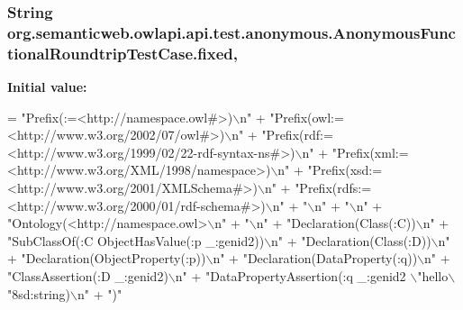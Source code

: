 \hypertarget{classorg_1_1semanticweb_1_1owlapi_1_1api_1_1test_1_1anonymous_1_1_anonymous_functional_roundtrip_test_case_afb329aafe42661dcf0c787507485b0ac}{
\subsubsection[{fixed}]{\setlength{\rightskip}{0pt plus 5cm}String org.\-semanticweb.\-owlapi.\-api.\-test.\-anonymous.\-Anonymous\-Functional\-Roundtrip\-Test\-Case.\-fixed\hspace{0.3cm}{\ttfamily [static]}, {\ttfamily [private]}}}\label{classorg_1_1semanticweb_1_1owlapi_1_1api_1_1test_1_1anonymous_1_1_anonymous_functional_roundtrip_test_case_afb329aafe42661dcf0c787507485b0ac}
{\bfseries Initial value\-:}
\begin{DoxyCode}
= \textcolor{stringliteral}{"Prefix(:=<http://namespace.owl#>)\(\backslash\)n"}
            + \textcolor{stringliteral}{"Prefix(owl:=<http://www.w3.org/2002/07/owl#>)\(\backslash\)n"}
            + \textcolor{stringliteral}{"Prefix(rdf:=<http://www.w3.org/1999/02/22-rdf-syntax-ns#>)\(\backslash\)n"}
            + \textcolor{stringliteral}{"Prefix(xml:=<http://www.w3.org/XML/1998/namespace>)\(\backslash\)n"}
            + \textcolor{stringliteral}{"Prefix(xsd:=<http://www.w3.org/2001/XMLSchema#>)\(\backslash\)n"}
            + \textcolor{stringliteral}{"Prefix(rdfs:=<http://www.w3.org/2000/01/rdf-schema#>)\(\backslash\)n"} + \textcolor{stringliteral}{"\(\backslash\)n"} + \textcolor{stringliteral}{"\(\backslash\)n"}
            + \textcolor{stringliteral}{"Ontology(<http://namespace.owl>\(\backslash\)n"} + \textcolor{stringliteral}{"\(\backslash\)n"} + \textcolor{stringliteral}{"Declaration(Class(:C))\(\backslash\)n"}
            + \textcolor{stringliteral}{"SubClassOf(:C ObjectHasValue(:p \_:genid2))\(\backslash\)n"} + \textcolor{stringliteral}{"Declaration(Class(:D))\(\backslash\)n"}
            + \textcolor{stringliteral}{"Declaration(ObjectProperty(:p))\(\backslash\)n"} + \textcolor{stringliteral}{"Declaration(DataProperty(:q))\(\backslash\)n"}
            + \textcolor{stringliteral}{"ClassAssertion(:D \_:genid2)\(\backslash\)n"}
            + \textcolor{stringliteral}{"DataPropertyAssertion(:q \_:genid2 \(\backslash\)"hello\(\backslash\)"^^xsd:string)\(\backslash\)n"} + \textcolor{stringliteral}{")"}
\end{DoxyCode}
